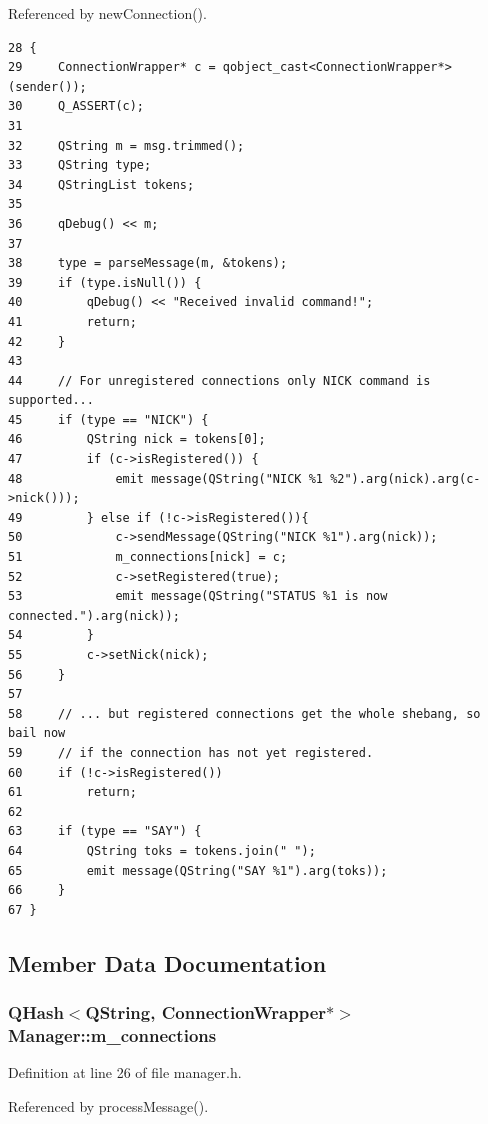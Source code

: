 Referenced by newConnection().

\begin{Code}\begin{verbatim}28 {
29     ConnectionWrapper* c = qobject_cast<ConnectionWrapper*>(sender());
30     Q_ASSERT(c);
31 
32     QString m = msg.trimmed();
33     QString type;
34     QStringList tokens;
35     
36     qDebug() << m;
37     
38     type = parseMessage(m, &tokens);
39     if (type.isNull()) {
40         qDebug() << "Received invalid command!";
41         return;
42     }
43 
44     // For unregistered connections only NICK command is supported...
45     if (type == "NICK") {
46         QString nick = tokens[0];
47         if (c->isRegistered()) {
48             emit message(QString("NICK %1 %2").arg(nick).arg(c->nick()));
49         } else if (!c->isRegistered()){
50             c->sendMessage(QString("NICK %1").arg(nick));
51             m_connections[nick] = c;
52             c->setRegistered(true);
53             emit message(QString("STATUS %1 is now connected.").arg(nick));
54         }
55         c->setNick(nick);
56     }
57 
58     // ... but registered connections get the whole shebang, so bail now
59     // if the connection has not yet registered.
60     if (!c->isRegistered())
61         return;
62 
63     if (type == "SAY") {
64         QString toks = tokens.join(" ");
65         emit message(QString("SAY %1").arg(toks));
66     }
67 }
\end{verbatim}
\end{Code}




\subsection{Member Data Documentation}
\subsubsection{\setlength{\rightskip}{0pt plus 5cm}QHash$<$QString, {\bf ConnectionWrapper}$\ast$$>$ {\bf Manager::m\_\-connections}\hspace{0.3cm}{\tt  [private]}}\label{classManager_5a8a686f11fabe55d7ae84990f9e2113}




Definition at line 26 of file manager.h.

Referenced by processMessage().
